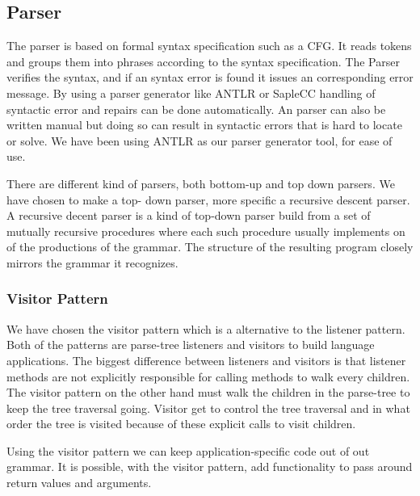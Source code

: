 \subsection*{Parser}
The parser is based on formal syntax specification such as a CFG. 
It reads tokens and groups them into phrases according to the syntax specification.
The Parser verifies the syntax, and if an syntax error is found it issues an corresponding error message.
 \citep{Crafting}
By using a parser generator like ANTLR or SapleCC handling of syntactic error and repairs can be done automatically.
An parser can also be written manual but doing so can result in syntactic errors that is hard to locate or solve.
We have been using ANTLR as our parser generator tool, for ease of use.

There are different kind of parsers, both bottom-up and top down parsers.
We have chosen to make a top- down parser, more specific a recursive descent parser.
A recursive decent parser is a kind of top-down parser build from a set of mutually recursive procedures where each such procedure usually implements on of the productions of the grammar.
The structure of the resulting program closely mirrors the grammar it recognizes.\citep{Recursive_programming}




\subsubsection*{Visitor Pattern}
We have chosen the visitor pattern which is a alternative to the listener pattern.
Both of the patterns are parse-tree listeners and visitors to build language applications.
The biggest difference between listeners and visitors is that listener methods are not explicitly responsible for calling methods to walk every children.
The visitor pattern on the other hand must walk the children in the parse-tree to keep the tree traversal going.
Visitor get to control the tree traversal and in what order the tree is visited because of these explicit calls to visit children.\citep{ANTLR4_Book}

Using the visitor pattern we can keep application-specific code out of out grammar.
It is possible, with the visitor pattern, add functionality to pass around return values and arguments.
